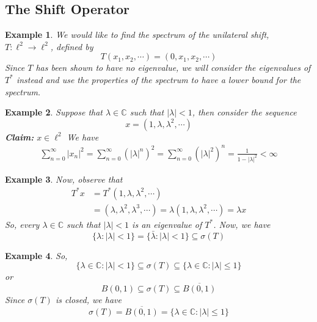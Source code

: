\documentclass{beamer}
\newtheorem{exm}{Example}
\begin{document}
  \subsection{The Shift Operator}
  \begin{frame}{\subsecname}
    \begin{exm}
      We would like to find the spectrum of the unilateral shift, $T:\ell^{2}\to\ell^{2}$, defined by
      $$
      T(x_{1},x_{2},\cdots) = (0,x_{1},x_{2},\cdots)
      $$
      Since $T$ has been shown to have no eigenvalue, we will consider the eigenvalues of $T^{*}$ instead and use the properties of the spectrum to have a lower bound for the spectrum.
    \end{exm}
  \end{frame}

  \begin{frame}{\subsecname}
    \begin{exm}
      Suppose that $\lambda\in\mathbb{C}$ such that $|\lambda|<1$, then consider the sequence
      \pause
      $$
      x = (1,\lambda,\lambda^{2},\cdots)
      $$
      \pause
      \textbf{Claim: }$x\in\ell^{2}$
      \pause
      \newline
      We have
      $$
      \begin{aligned}
        \sum^{\infty}_{n=0}|x_{n}|^{2} = \sum^{\infty}_{n=0}(|\lambda|^{n})^{2} = \sum^{\infty}_{n=0}(|\lambda|^{2})^{n} = \frac{1}{1-|\lambda|^{2}} < \infty
      \end{aligned}
      $$
    \end{exm}
  \end{frame}

  \begin{frame}{\subsecname}
    \begin{exm}
      Now, observe that
      \pause
      $$
      \begin{aligned}
        T^{*}x &= T^{*}(1,\lambda,\lambda^{2},\cdots) \\
           &= (\lambda,\lambda^{2},\lambda^{3},\cdots) = \lambda(1,\lambda,\lambda^{2},\cdots) = \lambda x
      \end{aligned}
      $$
      \pause
      So, every $\lambda\in\mathbb{C}$ such that $|\lambda|<1$ is an eigenvalue of $T^{*}$.
      \pause
      Now, we have
      $$
      \{\lambda:|\lambda|<1\}=\{\bar{\lambda}:|\lambda|<1\}\subseteq\sigma(T)
      $$
    \end{exm}
  \end{frame}

  \begin{frame}{\subsecname}
    \begin{exm}
      So,
      $$
      \{\lambda\in\mathbb{C}:|\lambda|<1\}\subseteq\sigma(T)\subseteq\{\lambda\in\mathbb{C}:|\lambda|\leq 1\}
      $$
      \pause
      or
      $$
      B(0,1)\subseteq\sigma(T)\subseteq\overline{B(0,1)}
      $$
      \pause
      Since $\sigma(T)$ is closed, we have
      $$
      \sigma(T)=\overline{B(0,1)}=\{\lambda\in\mathbb{C}:|\lambda|\leq 1\}
      $$
    \end{exm}
  \end{frame}
\end{document}
